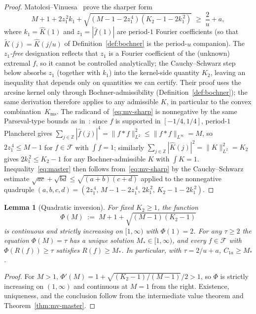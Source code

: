 \documentclass[11pt, letterpaper]{article}
\theoremstyle{paperplain}
\newtheorem{lemma}[theorem]{Lemma}
\theoremstyle{paperdef}
\newcommand{\Z}{\mathbb{Z}}
\newcommand{\Linf}{L^\infty}
\newcommand{\Kms}{K_{\mathrm{ms}}}
\begin{document}
\begin{proof}
Matolcsi--Vinuesa~\cite[Lemma~3.3, Eq.~(10)]{MV10} prove the sharper
form
\begin{equation}\label{eq:mv-sharp}
  M + 1 + 2 z_1^{\,2} k_1
  + \sqrt{(M-1-2z_1^{\,4})(K_2-1-2k_1^{\,2})}
  \;\ge\;
  \frac{2}{u} + a,
\end{equation}
where $k_1=\widehat{K}(1)$ and $z_1=|\widehat{f}(1)|$ are
period-$1$ Fourier coefficients (so that $\widetilde{K}(j)
=\widehat{K}(j/u)$ of Definition~\ref{def:bochner} is the
period-$u$ companion).  The \emph{$z_1$-free} designation reflects
that $z_1$ is a Fourier coefficient of the (unknown) extremal $f$,
so it cannot be controlled analytically; the Cauchy--Schwarz step
below absorbs $z_1$ (together with $k_1$) into the kernel-side
quantity $K_2$, leaving an inequality that depends only on quantities
we can certify.  Their proof uses the arcsine kernel only through
Bochner-admissibility (Definition~\ref{def:bochner}); the same
derivation therefore applies to any admissible $K$, in particular
to the convex combination~$\Kms$.  The radicand of~\eqref{eq:mv-sharp}
is nonnegative by the same Parseval-type bounds as in~\cite[\S 3]{MV10}:
since $f$ is supported in $[-1/4,1/4]$, period-$1$ Plancherel gives
$\sum_{j\in\Z}|\widehat{f}(j)|^{4}=\|f*f\|_{L^{2}}^{2}\le\|f*f\|_{\Linf}=M$,
so $2z_1^{\,4}\le M-1$ for $f\in\mathcal{F}$ with $\int f=1$; similarly
$\sum_{j\in\Z}|\widehat{K}(j)|^{2}=\|K\|_{L^{2}}^{2}=K_2$ gives
$2k_1^{\,2}\le K_2-1$ for any Bochner-admissible $K$ with $\int K=1$.
Inequality~\eqref{eq:master} then follows from~\eqref{eq:mv-sharp}
by the Cauchy--Schwarz estimate
$\sqrt{ac}+\sqrt{bd}\le\sqrt{(a+b)(c+d)}$ applied to the nonnegative
quadruple
$(a,b,c,d)=(2z_1^{\,4},\,M-1-2z_1^{\,4},\,2k_1^{\,2},\,K_2-1-2k_1^{\,2})$.
\end{proof}

\begin{lemma}[Quadratic inversion]
\label{lem:inversion}
For fixed $K_2\ge 1$, the function
\[
  \Phi(M)\;:=\;M+1+\sqrt{(M-1)(K_2-1)}
\]
is continuous and strictly increasing on $[1,\infty)$ with
$\Phi(1)=2$.  For any $\tau\ge 2$ the equation $\Phi(M)=\tau$ has a
unique solution $M_*\in[1,\infty)$, and every $f\in\mathcal{F}$ with
$\Phi(R(f))\ge\tau$ satisfies $R(f)\ge M_*$.  In particular, with
$\tau=2/u+a$, $C_{1a}\ge M_*$.
\end{lemma}

\begin{proof}
For $M>1$, $\Phi'(M)=1+\sqrt{(K_2-1)/(M-1)}/2>1$, so $\Phi$ is
strictly increasing on $(1,\infty)$ and continuous at $M=1$ from the
right.  Existence, uniqueness, and the conclusion follow from the
intermediate value theorem and Theorem~\ref{thm:mv-master}.
\end{proof}
\end{document}
